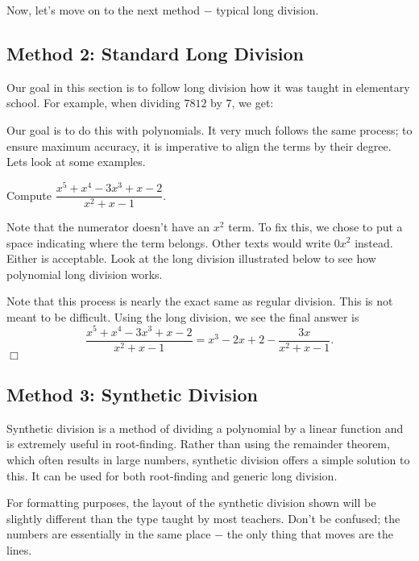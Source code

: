 \documentclass[lang=en,11pt]{elegantbook}
\begin{document}
Now, let's move on to the next method $-$ typical long division.
\subsection{Method 2: Standard Long Division}
\noindent Our goal in this section is to follow long division how it was taught in elementary school.  For example, when dividing $7812$ by $7$, we get:


\noindent Our goal is to do this with polynomials.  It very much follows the same process; to ensure maximum accuracy, it is imperative to align the terms by their degree.  Lets look at some examples.
\begin{example}
Compute $\dfrac{x^5+x^4-3x^3+x-2}{x^2+x-1}$.
\end{example}
\begin{solution}
Note that the numerator doesn't have an $x^2$ term.  To fix this, we chose to put a space indicating where the term belongs.  Other texts would write $0x^2$ instead.  Either is acceptable.  Look at the long division illustrated below to see how polynomial long division works.


\noindent Note that this process is nearly the exact same as regular division.  This is not meant to be difficult.  Using the long division, we see the final answer is $$\dfrac{x^5+x^4-3x^3+x-2}{x^2+x-1}=x^3-2x+2-\dfrac{3x}{x^2+x-1}.$$ $\Box$
\end{solution}
\subsection{Method 3: Synthetic Division}
\noindent Synthetic division is a method of dividing a polynomial by a linear function and is extremely useful in root-finding.  Rather than using the remainder theorem, which often results in large numbers, synthetic division offers a simple solution to this.  It can be used for both root-finding and generic long division.

For formatting purposes, the layout of the synthetic division shown will be slightly different than the type taught by most teachers.  Don't be confused; the numbers are essentially in the same place $-$ the only thing that moves are the lines.
\end{document}
